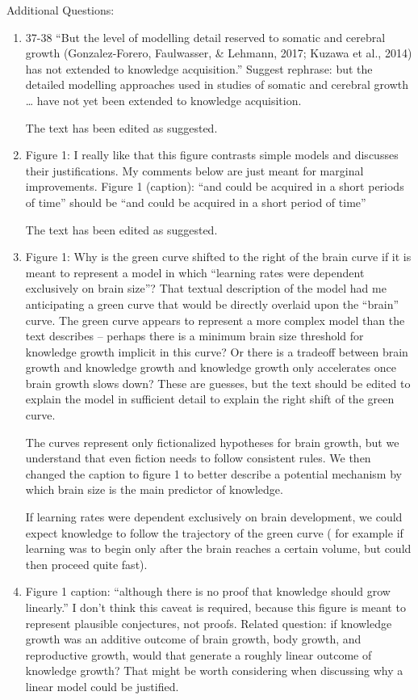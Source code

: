 \documentclass{article}
\newcommand{\rev}[1]{{\color{Red}#1}}
\newcommand{\comment}[1]{{\color{Blue}#1}}
\begin{document}
Additional Questions:
\begin{enumerate}
    \item 37-38 “But the level of modelling detail reserved to somatic and cerebral growth (Gonzalez-Forero, Faulwasser, \& Lehmann, 2017; Kuzawa et al., 2014) has not extended to knowledge acquisition.” Suggest rephrase: but the detailed modelling approaches used in studies of somatic and cerebral growth … have not yet been extended to knowledge acquisition.
    
    \comment{The text has been edited as suggested. }

    \item Figure 1: I really like that this figure contrasts simple models and discusses their justifications. My comments below are just meant for marginal improvements. Figure 1 (caption): “and could be acquired in a short periods of time” should be “and could be acquired in a short period of time”

    \comment{The text has been edited as suggested. }
    
    \item Figure 1: Why is the green curve shifted to the right of the brain curve if it is meant to represent a model in which “learning rates were dependent exclusively on brain size”? That textual description of the model had me anticipating a green curve that would be directly overlaid upon the “brain” curve. The green curve appears to represent a more complex model than the text describes – perhaps there is a minimum brain size threshold for knowledge growth implicit in this curve? Or there is a tradeoff between brain growth and knowledge growth and knowledge growth only accelerates once brain growth slows down? These are guesses, but the text should be edited to explain the model in sufficient detail to explain the right shift of the green curve.
    
    \comment{The curves represent only fictionalized hypotheses for brain growth, but we understand that even fiction needs to follow consistent rules. We then changed the caption to figure 1 to better describe a potential mechanism by which brain size is the main predictor of knowledge.}
    
    \rev{If learning rates were dependent exclusively on brain development, we could expect knowledge to follow the trajectory of the green curve ( for example if learning was to begin only after the brain reaches a certain volume, but could then proceed quite fast).}

    \item Figure 1 caption: “although there is no proof that knowledge should grow linearly.” I don’t think this caveat is required, because this figure is meant to represent plausible conjectures, not proofs. Related question: if knowledge growth was an additive outcome of brain growth, body growth, and reproductive growth, would that generate a roughly linear outcome of knowledge growth? That might be worth considering when discussing why a linear model could be justified.
    

\end{enumerate}
\end{document}
